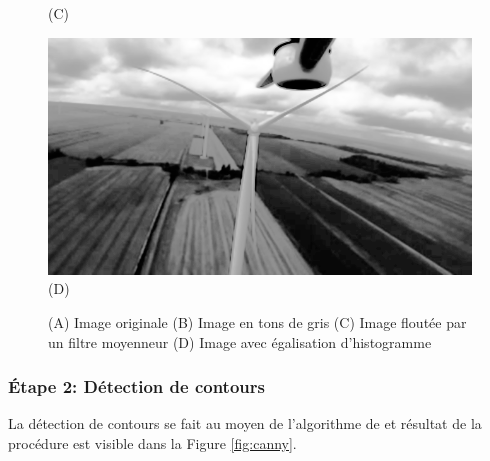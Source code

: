 \begin{figure}[htp]
\begin{minipage}{0.49\textwidth}
  (C)
\end{minipage}
\begin{minipage}{0.49\textwidth}
  \centering
  \includegraphics[width=\linewidth]{images/preprocess_histogram.png}
  (D)
\end{minipage}
\caption{(A) Image originale (B) Image en tons de gris (C) Image floutée par un filtre moyenneur (D) Image avec égalisation d'histogramme}
\label{fig:detection_pretraitement}
\end{figure}

\subsubsection{Étape 2: Détection de contours}
La détection de contours se fait au moyen de l'algorithme de \citep{Canny1986} et résultat de la procédure est visible dans la Figure \ref{fig:canny}.

